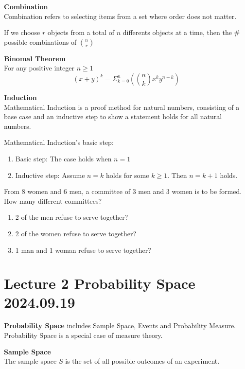 \documentclass{article}
\begin{document}
\begin{definition}
    \textbf{Combination}\\
    Combination refers to selecting items from a set where order does not matter.
\end{definition}

\begin{theorem}
    If we choose $r$ objects from a total of $n$ differents objects at a time, then the \# possible combinations of $\binom{n}{r}$
\end{theorem}

\begin{theorem}
    \textbf{Binomal Theorem}\\
    For any positive integer $n \geq 1$
    $$ (x + y)^k = \Sigma^n_{k=0}(\binom{n}{k}x^ky^{n-k})$$
\end{theorem}
\begin{definition}
    \textbf{Induction}\\
    Mathematical Induction is a proof method for natural numbers, consisting of a base case and an inductive step to show a statement holds for all natural numbers.
\end{definition}
Mathematical Induction's basic step:
\begin{enumerate}
    \item Basic step: The case holds when $n = 1$
    \item Inductive step: Assume $n = k$ holds for some $k \geq 1$. Then $n = k+1$ holds.
\end{enumerate}

\begin{quiz}
    From 8 women and 6 men, a committee of 3 men and 3 women is to be formed. How many different committees?
    \begin{enumerate}
        \item 2 of the men refuse to serve together?
        \item 2 of the women refuse to serve together?
        \item 1 man and 1 woman refuse to serve together?
    \end{enumerate}
\end{quiz}



\section{Lecture 2 Probability Space 2024.09.19}
\textbf{Probability Space} includes Sample Space, Events and Probability Measure.\\
Probability Space is a special case of measure theory.
\begin{definition}
    \textbf{Sample Space}\\
    The sample space $S$ is the set of all possible outcomes of an experiment.
\end{definition}
\end{document}
